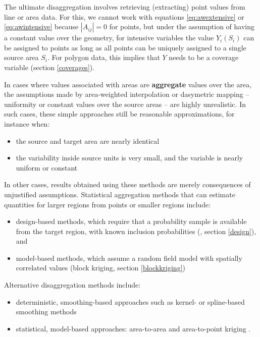\documentclass[]{book}
\providecommand{\tightlist}{%
  \setlength{\itemsep}{0pt}\setlength{\parskip}{0pt}}
\begin{document}
The ultimate disaggregation involves retrieving (extracting)
point values from line or area data. For this, we cannot work with
equations \eqref{eq:awextensive} or \eqref{eq:awintensive} because
\(|A_{ij}| = 0\) for points, but under the assumption of having a
constant value over the geometry, for intensive variables the value
\(Y_i(S_i)\) can be assigned to points as long as all points can be
uniquely assigned to a single source area \(S_i\). For polygon data,
this implies that \(Y\) needs to be a coverage variable (section
\ref{coverages}).

In cases where values associated with areas are \textbf{aggregate} values
over the area, the assumptions made by area-weighted interpolation
or dasymetric mapping -- uniformity or constant values over the
source areas -- are highly unrealistic. In such cases, these simple
approaches still be reasonable approximations, for instance when:

\begin{itemize}
\tightlist
\item
  the source and target area are nearly identical
\item
  the variability inside source units is very small, and the variable
  is nearly uniform or constant
\end{itemize}

In other cases, results obtained using these methods are merely
consequences of unjustified assumptions. Statistical aggregation
methods that can estimate quantities for larger regions from points
or smaller regions include:

\begin{itemize}
\tightlist
\item
  design-based methods, which require that a probability sample is
  available from the target region, with known inclusion probabilities
  (\citet{brus2021}, section \ref{design}), and
\item
  model-based methods, which assume a random field model with spatially
  correlated values (block kriging, section \ref{blockkriging})
\end{itemize}

Alternative disaggregation methods include:

\begin{itemize}
\tightlist
\item
  deterministic, smoothing-based approaches such as kernel- or spline-based
  smoothing methods \citep{toblerpyc, martin89}
\item
  statistical, model-based approaches: area-to-area and area-to-point
  kriging \citep{kyriakidis04, stcos}.
\end{itemize}
\end{document}
